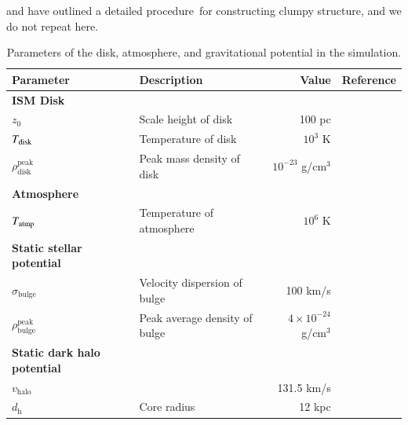 \documentclass[twocolumn]{aastex631}
\begin{document}
  \citet{LA2002} and \citet{Wagner2012} have outlined a detailed procedure\
   for constructing clumpy structure, and we do not repeat here.


\begin{table}[t]
\centering
\caption{Parameters of the disk, atmosphere, and gravitational potential in the simulation.}
\label{table-parameters}
\begin{tabular}{@{}llrr@{}}
\toprule[1pt]\midrule[0.3pt]
Parameter                                             & Description                   & Value                          & Reference                       \\ \midrule
{\bf ISM Disk }\citep{peak-ism-density}                   &                               &                                &                                 \\
$z_{0}$                                               & Scale height of disk          & 100 pc                         &                                 \\
$T_{\text{\text{disk}}}$                              & Temperature of disk           & $10^{3}$ K                     &                                 \\
$\rho_{\text{disk}}^{\text{peak}}$                    & Peak mass density of disk     & $10^{-23}$ g/cm$^{3}$          &                                 \\ \hline
{\bf Atmosphere }\citep{temperature-MW}               &                               &                                &                                 \\
$T_{\text{\text{atmp}}}$                              & Temperature of atmosphere     & $10^{6}$ K                     &                                 \\ \hline
{\bf Static stellar potential }                       &                               &                                &                                 \\
$\sigma_{\text{bulge}}$                               & Velocity dispersion of bulge  & 100 km/s                       & \citep{velocity-dispersion-MW}  \\
$\rho_{\text{bulge}}^{\text{peak}}$                   & Peak average density of bulge & $4\times 10^{-24}$ g/cm$^{3}$  &                                 \\ \hline
{\bf Static dark halo potential }\citep{Johnston1995} &                               &                                &                                 \\
$v_{\text{halo}}$                                     &                               & 131.5 km/s                     &                                 \\
$d_{\text{h}}$                                        & Core radius                   & 12 kpc                         &                                 \\ \midrule
\end{tabular}
\end{table}
\end{document}
